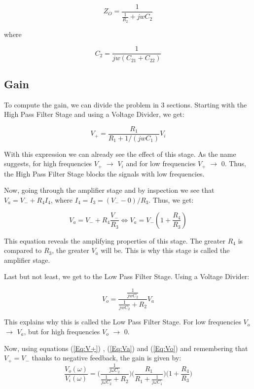 \begin{equation}
Z_{O}=\frac{1}{\frac{1}{R_2}+jwC_2}
\end{equation}

where

\begin{equation}
C_2=\frac{1}{jw(C_{21}+C_{22})}
\end{equation}

\subsection{Gain}

To compute the gain, we can divide the problem in 3 sections. Starting with the High Pass Filter Stage and using a Voltage Divider, we get:

\begin{equation}
V_{+}=\frac{R_1}{R_1+1/(jwC_1)}V_i
\label{Eq:V+}
\end{equation}

With this expression we can already see the effect of this stage. As the name suggests, for high frequencies $V_{+}$ $\to$ $V_i$ and for low frequencies $V_{+}$ $\to$ $0$.
Thus, the High Pass Filter Stage blocks the signals with low frequencies.

Now, going through the amplifier stage and by inspection we see that $V_a=V_{-}+R_4I_4$, where $I_4=I_3=(V_{-}-0)/R_3$. Thus, we get:

\begin{equation}
V_a=V_{-}+R_4\frac{V_{-}}{R_3}  \Leftrightarrow V_a = V_{-}\left(1+\frac{R_4}{R_3}\right)
\label{Eq:Va}
\end{equation}

This equation reveals the amplifying properties of this stage. The greater $R_4$ is compared to $R_3$, the greater $V_a$ will be. This is why this stage is called the amplifier stage.\par

Last but not least, we get to the Low Pass Filter Stage. Using a Voltage Divider:

\begin{equation}
  V_o=\frac{\frac{1}{jwC_2}}{\frac{1}{jwC_2}+R_2}V_a
\label{Eq:Vo}
\end{equation}

This explains why this is called the Low Pass Filter Stage. For low frequencies $V_o$ $\to$ $V_a$, but for high frequencies $V_o$ $\to$ $0$.\par

Now, using equations (\ref{Eq:V+}) , (\ref{Eq:Va}) and (\ref{Eq:Vo}) and remembering that $V_{+}=V_{-}$ thanks to negative feedback, the gain is given by:
\begin{equation}
\frac{V_o(\omega)}{V_i(\omega)}=\Bigg( \frac{ \frac{1}{j\omega C_2}}{\frac{1}{j\omega C_2}+R_2} \Bigg) \Bigg( \frac{R_1}{R_1+\frac{1}{j\omega C_1}}   \Bigg)  \Bigg( 1+\frac{R_4}{R_3}  \Bigg)
\end{equation}

